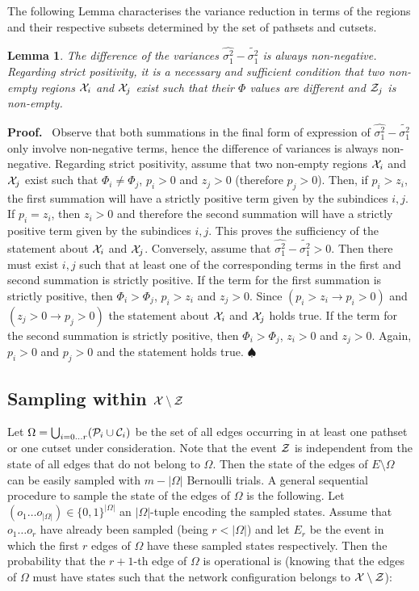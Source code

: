 \documentclass[a4paper]{article}
\newtheorem{lemma}{Lemma}
\newcommand{\bproof}{\textbf{Proof.}~}
\newcommand{\eproof}{$\spadesuit$\\}
\begin{document}
The following Lemma characterises the variance reduction in terms of the regions and their respective subsets determined by the set of pathsets and cutsets.

\begin{lemma} The difference of the variances $\widehat{\sigma^2_1} - \widetilde{\sigma^2_1}$ is always non-negative. Regarding strict positivity, it is a necessary and sufficient condition that two non-empty regions ${\cal X}_i$ and ${\cal X}_j$ exist such that their $\Phi$ values are different and ${\cal Z}_j$ is non-empty.
\end{lemma} \label{lem:varred}
\bproof
Observe that both summations in the final form of expression of $\widehat{\sigma^2_1} - \widetilde{\sigma^2_1}$ only involve non-negative terms, hence the difference of variances is always non-negative. Regarding strict positivity, assume that two non-empty regions ${\cal X}_i$ and ${\cal X}_j$ exist such that $\Phi_i \neq \Phi_j$, $p_i>0$ and $z_j>0$ (therefore $p_j>0$). Then, if $p_i>z_i$, the first summation will have a strictly positive term given by the subindices $i,j$. If $p_i=z_i$, then $z_i>0$ and therefore the second summation will have a strictly positive term given by the  subindices $i,j$. This proves the sufficiency of the statement about ${\cal X}_i$ and ${\cal X}_j$. Conversely, assume that $\widehat{\sigma^2_1} - \widetilde{\sigma^2_1} >0$. Then there must exist $i,j$ such that at least one of the corresponding terms in the first and second summation is strictly positive. If the term for the first summation is strictly positive, then $\Phi_i>\Phi_j$, $p_i>z_i$ and $z_j>0$. Since $(p_i>z_i\rightarrow p_i>0)$ and $(z_j>0\rightarrow p_j>0)$ the statement about ${\cal X}_i$ and ${\cal X}_j$ holds true. If the term for the second summation is strictly positive, then $\Phi_i>\Phi_j$, $z_i>0$ and $z_j>0$. Again, $p_i>0$ and $p_j>0$ and the statement holds true.
\eproof


\subsection{Sampling within ${\cal X}\setminus {\cal Z}$} \label{ss:sampling}

Let $\Omega=\bigcup_{i=0\dots r}({\cal P}_i \cup {\cal C}_i)$ be the set of all edges occurring in at least one pathset or one  cutset under consideration. Note that the event $\cal Z$ is independent from the state of all edges that do not belong to $\Omega$. Then the state of the edges of $E\setminus \Omega$ can be easily sampled with $m-|\Omega|$ Bernoulli trials.
A general sequential procedure to sample the state of the edges of $\Omega$ is the following. Let $(o_1\dots o_{|\Omega|})\in \{0,1\}^{|\Omega|}$ an $|\Omega|$-tuple encoding the sampled states. Assume that $o_1\dots o_r$ have already been sampled (being $r<|\Omega|$) and let $E_r$ be the event in which the first $r$ edges of $\Omega$ have these sampled states respectively. Then the probability that the $r+1$-th edge of $\Omega$ is operational is (knowing that the edges of $\Omega$ must have states such that the network configuration belongs to ${\cal X}\setminus {\cal Z}$):
\end{document}
